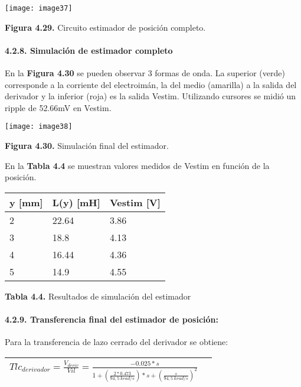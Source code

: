 \documentclass{article} %
\begin{document}
\noindent \texttt{[image: image37]}

\noindent \textbf{Figura 4.29. }Circuito estimador de posici\'{o}n completo.

\noindent 
\paragraph{4.2.8. Simulaci\'{o}n de estimador completo}

\noindent En la \textbf{Figura 4.30} se pueden observar 3 formas de onda. La superior (verde) corresponde a la corriente del electroim\'{a}n, la del medio (amarilla) a la salida del derivador y la inferior (roja) es la salida Vestim. Utilizando cursores se midi\'{o} un ripple de 52.66mV en Vestim.

\noindent 

\noindent \texttt{[image: image38]}

\noindent \textbf{Figura 4.30. }Simulaci\'{o}n final del estimador.

\noindent 

\noindent En la \textbf{Tabla 4.4} se muestran valores medidos de Vestim en funci\'{o}n de la posici\'{o}n.

\noindent 

\begin{tabular}{|p{1.6in}|p{1.6in}|p{1.6in}|} \hline 
y [mm] & L(y) [mH] & Vestim [V] \\ \hline 
2 & 22.64 & 3.86 \\ \hline 
3 & 18.8 & 4.13 \\ \hline 
4 & 16.44 & 4.36 \\ \hline 
5 & 14.9 & 4.55 \\ \hline 
\end{tabular}

\textbf{Tabla 4.4. }Resultados de simulaci\'{o}n del estimador

\noindent 
\paragraph{4.2.9. Transferencia final del estimador de posici\'{o}n:}

\noindent 

\noindent Para la transferencia de lazo cerrado del derivador se obtiene:

\noindent 

\begin{tabular}{|p{3.9in}|p{0.4in}|} \hline 
${Tlc}_{derivador}=\frac{V_{deriv}}{Vil}=\frac{-0.025*s}{1+(\frac{2*0.473}{94,5\ krad/s})*s+(\frac{s}{94,5\ krad/s})^2}$ &   \\ \hline 
\end{tabular}
\end{document}

